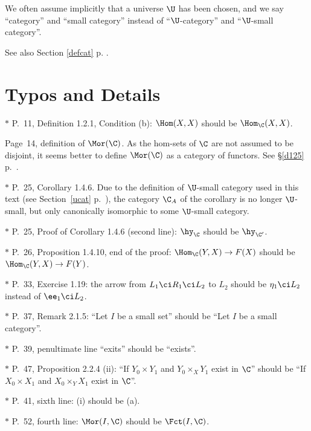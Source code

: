 \documentclass[12pt]{article}
\theoremstyle{remark}
\theoremstyle{definition}
\begin{document}
We often assume implicitly that a universe $\U$ has been chosen, and we say ``category'' and ``small category'' instead of ``$\U$-category'' and ``$\U$-small category''.

See also Section \ref{defcat} p. \pageref{defcat}. 


\section{Typos and Details}

$*$ P.~11, Definition 1.2.1, Condition (b): $\Hom(X,X)$ should be $\Hom_{\C}(X,X)$.

\begin{s} 
Page~14, definition of $\Mor(\C)$. As the hom-sets of $\C$ are not assumed to be disjoint, it seems better to define $\Mor(\C)$ as a category of functors. See \S\ref{d125} p.~. 
\end{s}%

\nn$*$ P.~25, Corollary 1.4.6. Due to the definition of $\U$-small category used in this text (see Section~\ref{ucat} p.~), the category $\C_A$ of the corollary is no longer $\U$-small, but only canonically isomorphic to some $\U$-small category. 

\nn$*$ P.~25, Proof of Corollary 1.4.6 (second line): $\hy_\C$ should be $\hy_{\C'}$.

\nn$*$ P.~26, Proposition 1.4.10, end of the proof: $\Hom_\C(Y,X)\to F(X)$ should be $\Hom_\C(Y,X)\to F(Y)$. 

\nn$*$ P.~33, Exercise 1.19: the arrow from $L_1\ci R_1\ci L_2$ to $L_2$ should be $\eta_1\ci L_2$ instead of $\ee_1\ci L_2$. 

\nn$*$ P.~37, Remark 2.1.5: ``Let $I$ be a small set'' should be ``Let $I$ be a small category''.

\nn$*$ P.~39, penultimate line ``exits'' should be ``exists''.

\nn$*$ P.~47, Proposition 2.2.4 (ii): ``If $Y_0\times Y_1$ and $Y_0\times_XY_1$ exist in $\C$'' should be ``If $X_0\times X_1$ and $X_0\times_YX_1$ exist in $\C$''.

\nn$*$ P.~41, sixth line: (i) should be (a). 

\nn$*$ P.~52, fourth line: $\Mor(I,\C)$ should be $\Fct(I,\C)$.
\end{document}
